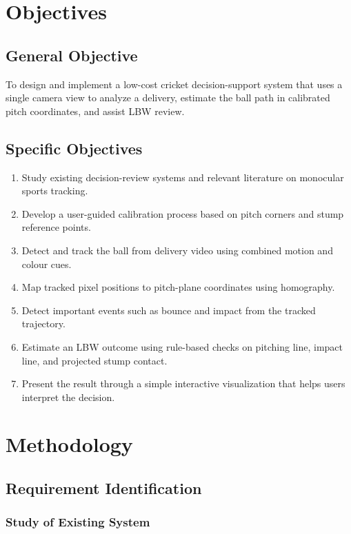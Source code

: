 \documentclass[12pt,a4paper]{article}
\begin{document}
\section{Objectives}

\subsection{General Objective}

To design and implement a low-cost cricket decision-support system that uses a single camera view to analyze a delivery, estimate the ball path in calibrated pitch coordinates, and assist LBW review.

\subsection{Specific Objectives}

\begin{enumerate}
    \item Study existing decision-review systems and relevant literature on monocular sports tracking.
    \item Develop a user-guided calibration process based on pitch corners and stump reference points.
    \item Detect and track the ball from delivery video using combined motion and colour cues.
    \item Map tracked pixel positions to pitch-plane coordinates using homography.
    \item Detect important events such as bounce and impact from the tracked trajectory.
    \item Estimate an LBW outcome using rule-based checks on pitching line, impact line, and projected stump contact.
    \item Present the result through a simple interactive visualization that helps users interpret the decision.
\end{enumerate}

\section{Methodology}

\subsection{Requirement Identification}

\subsubsection{Study of Existing System}
\end{document}
